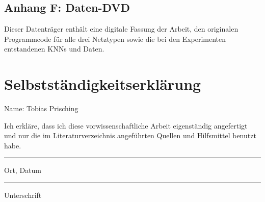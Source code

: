 \documentclass[
	a4paper,
	12pt,
	ngerman,
	oneside
]{scrreprt}											%
\begin{document}
	\section*{Anhang F: Daten-DVD}
	\begin{center}
		\hspace*{-1cm}
	\end{center}
	Dieser Datenträger enthält eine digitale Fassung der Arbeit, den originalen Programmcode für alle drei Netztypen sowie die bei den Experimenten entstandenen KNNs und Daten. 
	
	
	
	\chapter*{Selbstständigkeitserklärung}
		Name: Tobias Prisching\newline
	
		Ich erkläre, dass ich diese vorwissenschaftliche Arbeit eigenständig angefertigt und nur die im Literaturverzeichnis angeführten Quellen und Hilfsmittel benutzt habe.
	
		\vspace{3cm}
		
		\parbox{6cm}{\centering\hrule
		\strut \centering\footnotesize Ort, Datum} \hfill\parbox{6cm}{\hrule
		\strut \centering\footnotesize Unterschrift}
	
\end{document}
